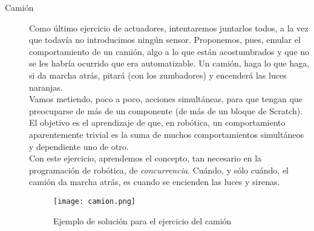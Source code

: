 \begin{description}
\item[Camión]\label{ej:camion}
Como último ejercicio de actuadores, intentaremos juntarlos todos, a la vez que todavía no introducimos ningún sensor. Proponemos, pues, emular el comportamiento de un camión, algo a lo que están acostumbrados y que no se les habría ocurrido que era automatizable. Un camión, haga lo que haga, si da marcha atrás, pitará (con los zumbadores) y encenderá las luces naranjas. \\
Vamos metiendo, poco a poco, acciones simultáneas, para que tengan que preocuparse de más de un componente (de más de un bloque de Scratch). El objetivo es el aprendizaje de que, en robótica, un comportamiento aparentemente trivial es la suma de muchos comportamientos simultáneos y dependiente uno de otro.\\
Con este ejercicio, aprendemos el concepto, tan necesario en la programación de robótica, de \textit{concurrencia}. Cuándo, y sólo cuándo, el camión da marcha atrás, es cuando se encienden las luces y sirenas.
\begin{figure}[h]
	\centering
	\texttt{[image: camion.png]}	
	\caption{Ejemplo de solución para el ejercicio del camión}
	\label{img:camion}
\end{figure}
\end{description}


